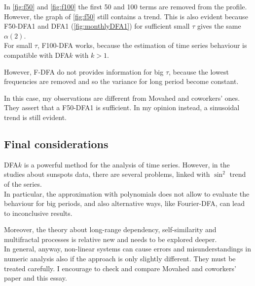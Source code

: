 In \autoref{fig:f50} and \autoref{fig:f100} the first 50 and 100 terms are removed from the profile. However, the graph of \autoref{fig:f50} still contains a trend. This is also evident because F50-DFA1 and DFA1 (\autoref{fig:monthlyDFA1}) for sufficient small $\tau$ gives the same $\alpha(2)$.\\
For small $\tau$, F100-DFA works, because the estimation of time series behaviour is compatible with DFA$k$ with $k>1$.

However, F-DFA do not provides information for big $\tau$, because the lowest frequencies are removed and so the variance for long period become constant. 

In this case, my observations are different from Movahed and coworkers' ones. They assert that a F50-DFA1 is sufficient. In my opinion instead, a sinusoidal trend is still evident. 

\subsection{Final considerations}
DFA$k$ is a powerful method for the analysis of time series. However, in the studies about sunspots data, there are several problems, linked with $\sin^2$ trend of the series.\\
In particular, the approximation with polynomials does not allow to evaluate the behaviour for big periods, and also alternative ways, like Fourier-DFA, can lead to inconclusive results.

Moreover, the theory about long-range dependency, self-similarity and multifractal processes is relative new and needs to be explored deeper.\\
In general, anyway, non-linear systems can cause errors and misunderstandings in numeric analysis also if the approach is only slightly different. They must be treated carefully. I encourage to check and compare Movahed and coworkers' paper and this essay.
